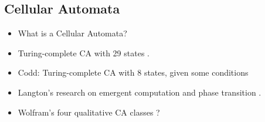 \subsection{Cellular Automata}

\begin{itemize}
    \item What is a Cellular Automata?
    \item Turing-complete CA with 29 states \cite{neumann1966selfreplication}.
    \item Codd: Turing-complete CA with 8 states, given some conditions \cite{codd1968cellular}
    \item Langton's research on emergent computation and phase transition \cite{langton1990edgeofchaos}.
    \item Wolfram's four qualitative CA classes \cite{wolfram1984complexity}?
\end{itemize}

